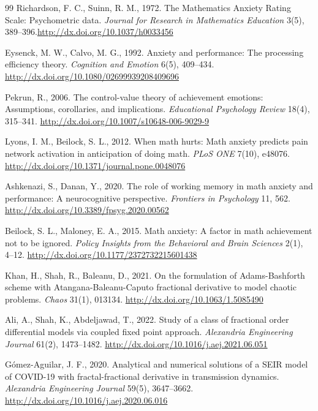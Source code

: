 \documentclass[10pt]{NSP1}
\begin{document}
\begin{thebibliography}{99}
 Richardson, F. C., Suinn, R. M., 1972. The Mathematics Anxiety Rating Scale: Psychometric data. \emph{Journal for Research in Mathematics Education} 3(5), 389--396.\url{http://dx.doi.org/10.1037/h0033456}

 Eysenck, M. W., Calvo, M. G., 1992. Anxiety and performance: The processing efficiency theory. \emph{Cognition and Emotion} 6(5), 409--434. \url{http://dx.doi.org/10.1080/02699939208409696}

 Pekrun, R., 2006. The control-value theory of achievement emotions: Assumptions, corollaries, and implications. \emph{Educational Psychology Review} 18(4), 315--341. \url{http://dx.doi.org/10.1007/s10648-006-9029-9}
    
     Lyons, I. M., Beilock, S. L., 2012. When math hurts: Math anxiety predicts pain network activation in anticipation of doing math. \emph{PLoS ONE} 7(10), e48076. \url{http://dx.doi.org/10.1371/journal.pone.0048076}
    
     Ashkenazi, S., Danan, Y., 2020. The role of working memory in math anxiety and performance: A neurocognitive perspective. \emph{Frontiers in Psychology} 11, 562. \url{http://dx.doi.org/10.3389/fpsyg.2020.00562}
        
        
        Beilock, S. L., Maloney, E. A., 2015. Math anxiety: A factor in math achievement not to be ignored. \emph{Policy Insights from the Behavioral and Brain Sciences} 2(1), 4--12.  \url{http://dx.doi.org/10.1177/2372732215601438}
            

 Khan, H., Shah, R., Baleanu, D., 2021. On the formulation of Adams-Bashforth scheme with Atangana-Baleanu-Caputo fractional derivative to model chaotic problems. \emph{Chaos} 31(1), 013134. \url{http://dx.doi.org/10.1063/1.5085490}

 Ali, A., Shah, K., Abdeljawad, T., 2022. Study of a class of fractional order differential models via coupled fixed point approach. \emph{Alexandria Engineering Journal} 61(2), 1473--1482. \url{http://dx.doi.org/10.1016/j.aej.2021.06.051}

 G\'{o}mez-Aguilar, J. F., 2020. Analytical and numerical solutions of a SEIR model of COVID-19 with fractal-fractional derivative in transmission dynamics. \emph{Alexandria Engineering Journal} 59(5), 3647--3662. \url{http://dx.doi.org/10.1016/j.aej.2020.06.016}




\end{thebibliography}
\end{document}
